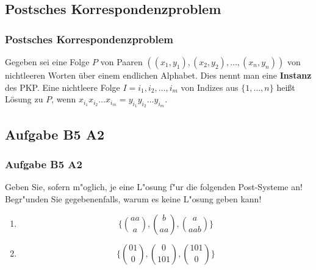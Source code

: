 \subsection{Postsches Korrespondenzproblem}
\begin{frame}
\frametitle{Postsches Korrespondenzproblem}
Gegeben sei eine Folge $P$ von Paaren $((x_1, y_1), (x_2, y_2), \ldots, (x_n,y_n))$ von nichtleeren Worten über einem endlichen Alphabet. Dies nennt man eine \textbf{Instanz} des PKP.
Eine nichtleere Folge $I = i_1, i_2, \ldots, i_m$ von Indizes aus $\{1, \ldots, n\}$ heißt Lösung zu $P$, wenn $x_{i_1}x_{i_2}\ldots{}x_{i_m} = y_{i_1}y_{i_2}\ldots{}y_{i_m}$.
\end{frame}
\subsection{Aufgabe B5 A2}
\begin{frame}
	\frametitle{Aufgabe B5 A2}
	Geben Sie, sofern m"oglich, je eine L"osung f"ur die folgenden Post-Systeme an! \\
	Begr"unden Sie gegebenenfalls, warum es keine L"osung geben kann!
	\vspace{5mm}
	\begin{enumerate}
		\item \begin{displaymath} \{ {aa \choose a}, {b \choose aa}, {a \choose aab} \} \end{displaymath}
		\item \begin{displaymath} \{ {01 \choose 0}, {0 \choose 101}, {101 \choose 0} \} \end{displaymath}
	\end{enumerate}
\end{frame}

